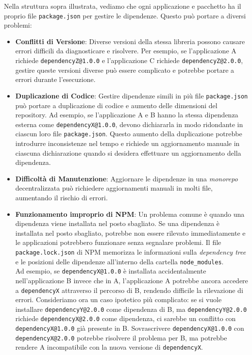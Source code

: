 Nella struttura sopra illustrata, vediamo che ogni applicazione e pacchetto ha il proprio file \texttt{package.json} per gestire le dipendenze.
Questo può portare a diversi problemi:

\begin{itemize}
    \item \textbf{Conflitti di Versione}: Diverse versioni della stessa libreria possono causare errori difficili da diagnosticare e risolvere.
    Per esempio, se l'applicazione A richiede \texttt{dependencyZ@1.0.0} e l'applicazione C richiede \texttt{dependencyZ@2.0.0}, gestire queste versioni diverse può essere complicato e potrebbe portare a errori durante l'esecuzione.
    \item \textbf{Duplicazione di Codice}: Gestire dipendenze simili in più file \texttt{package.json} può portare a duplicazione di codice e aumento delle dimensioni del repository.
    Ad esempio, se l'applicazione A e B hanno la stessa dipendenza esterna come \texttt{dependencyX@1.0.0}, devono dichiararla in modo ridondante in ciascun loro file \texttt{package.json}.
    Questo aumento della duplicazione potrebbe introdurre inconsistenze nel tempo e richiede un aggiornamento manuale in ciascuna dichiarazione quando si desidera effettuare un aggiornamento della dipendenza.
    \item \textbf{Difficoltà di Manutenzione}: Aggiornare le dipendenze in una \textit{monorepo} decentralizzata può richiedere aggiornamenti manuali in molti file, aumentando il rischio di errori.
    \item \textbf{Funzionamento improprio di NPM}: Un problema comune è quando una dipendenza viene installata nel posto sbagliato. Se una dipendenza è installata nel posto sbagliato, potrebbe non essere rilevato immediatamente e le applicazioni potrebbero funzionare senza segnalare problemi.
    Il file \texttt{package.lock.json} di NPM memorizza le informazioni sulla \textit{dependency tree} e le posizioni delle dipendenze all'interno della cartella \texttt{node\_modules}.
    \\Ad esempio, se \texttt{dependencyX@1.0.0} è installata accidentalmente nell'applicazione B invece che in A, l'applicazione A potrebbe ancora accedere a \texttt{dependencyX} attraverso il percorso di B, rendendo difficile la rilevazione di errori.
    Consideriamo ora un caso ipotetico più complicato: se si vuole installare \texttt{dependencyY@2.0.0} come dipendenza di B, ma \texttt{dependencyY@2.0.0} richiede \texttt{dependencyX@2.0.0} come dipendenza, ci sarebbe un conflitto con \texttt{dependencyX@1.0.0} già presente in B. Sovrascrivere \texttt{dependencyX@1.0.0} con \texttt{dependencyX@2.0.0} potrebbe risolvere il problema per B, ma potrebbe rendere A incompatibile con la nuova versione di \texttt{dependencyX}.
\end{itemize}


